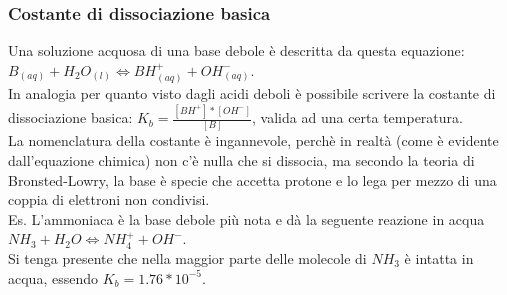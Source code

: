 \subsubsection{Costante di dissociazione basica}
Una soluzione acquosa di una base debole è descritta da questa equazione: $B_{(aq)} + H_2O_{(l)} \Leftrightarrow BH^+_{(aq)} + OH^-_{(aq)}$.\\
In analogia per quanto visto dagli acidi deboli è possibile scrivere la costante di dissociazione basica: $K_b = \frac{[BH^+] * [OH^-]}{[B]}$, valida ad una certa temperatura.\\
La nomenclatura della costante è ingannevole, perchè in realtà (come è evidente dall'equazione chimica) non c'è nulla che si dissocia, ma secondo la teoria di Bronsted-Lowry, la base è specie che accetta protone e lo lega per mezzo di una coppia di elettroni non condivisi.\\
Es. L'ammoniaca è la base debole più nota e dà la seguente reazione in acqua $NH_3 + H_2O \Leftrightarrow NH_4^+ + OH^-$.\\
Si tenga presente che nella maggior parte delle molecole di $NH_3$ è intatta in acqua, essendo $K_b = 1.76 * 10^{-5}$.\\
